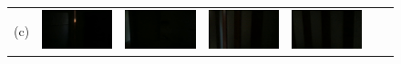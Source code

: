 \documentclass[letterpaper, 10 pt, conference]{ieeeconf}  %
\begin{document}
\begin{figure}
\begin{tabular*}{\textwidth}{ccccccc}
 (c) &
 \includegraphics[width=\imgW,height=\imgH]{rio-rf1} &
 \includegraphics[width=\imgW,height=\imgH]{rio-rf2} &
 \includegraphics[width=\imgW,height=\imgH]{rio-rf4} &
 \includegraphics[width=\imgW,height=\imgH]{rio-rf5} &

\end{tabular*}
\end{figure}
\end{document}
